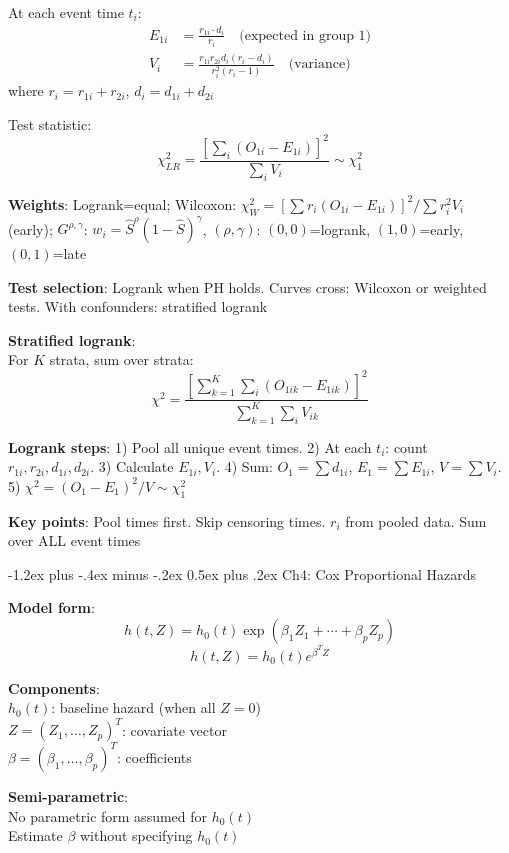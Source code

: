 ﻿\documentclass[10pt,letterpaper]{extarticle}
\makeatletter
\renewcommand{\section}{\@startsection{section}{1}{0mm}%
                                {-1.2ex plus -.4ex minus -.2ex}%
                                {0.5ex plus .2ex}%
                                {\normalfont\normalsize\bfseries}}
\newcommand{\h}[1]{\textbf{#1}}
\makeatother
\begin{document}
\begin{multicols}{3}
At each event time $t_i$:
\begin{align*}
E_{1i} &= \frac{r_{1i} \cdot d_i}{r_i} \quad \text{(expected in group 1)} \\
V_i &= \frac{r_{1i} r_{2i} d_i (r_i - d_i)}{r_i^2(r_i-1)} \quad \text{(variance)}
\end{align*}
where $r_i = r_{1i} + r_{2i}$, $d_i = d_{1i} + d_{2i}$

Test statistic:
$$\chi^2_{LR} = \frac{[\sum_i (O_{1i} - E_{1i})]^2}{\sum_i V_i} \sim \chi^2_1$$

\h{Weights}: Logrank=equal; Wilcoxon: $\chi^2_W = [\sum r_i(O_{1i}-E_{1i})]^2/\sum r_i^2 V_i$ (early); $G^{\rho,\gamma}$: $w_i = \hat{S}^{\rho}(1-\hat{S})^\gamma$, $(\rho,\gamma)$: $(0,0)$=logrank, $(1,0)$=early, $(0,1)$=late

\h{Test selection}: Logrank when PH holds. Curves cross: Wilcoxon or weighted tests. With confounders: stratified logrank

\h{Stratified logrank}: \\
For $K$ strata, sum over strata:
$$\chi^2 = \frac{[\sum_{k=1}^K \sum_i (O_{1ik} - E_{1ik})]^2}{\sum_{k=1}^K \sum_i V_{ik}}$$

\h{Logrank steps}: 1) Pool all unique event times. 2) At each $t_i$: count $r_{1i}, r_{2i}, d_{1i}, d_{2i}$. 3) Calculate $E_{1i}, V_i$. 4) Sum: $O_1=\sum d_{1i}$, $E_1=\sum E_{1i}$, $V=\sum V_i$. 5) $\chi^2=(O_1-E_1)^2/V \sim \chi^2_1$

\h{Key points}: Pool times first. Skip censoring times. $r_i$ from pooled data. Sum over ALL event times

\vspace{2pt}
\section{Ch4: Cox Proportional Hazards}

\h{Model form}: \\
$$h(t, Z) = h_0(t) \exp(\beta_1 Z_1 + \cdots + \beta_p Z_p)$$
$$h(t, Z) = h_0(t) e^{\beta^T Z}$$

\h{Components}: \\
$h_0(t)$: baseline hazard (when all $Z=0$) \\
$Z = (Z_1, \ldots, Z_p)^T$: covariate vector \\
$\beta = (\beta_1, \ldots, \beta_p)^T$: coefficients

\h{Semi-parametric}: \\
No parametric form assumed for $h_0(t)$ \\
Estimate $\beta$ without specifying $h_0(t)$


\end{multicols}
\end{document}
